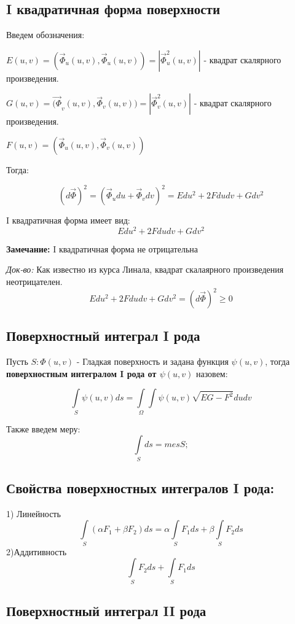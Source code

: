 \documentclass[12pt]{article}
\begin{document}
\subsection*{I квадратичная форма поверхности}
	
	Введем обозначения:
		
	$E(u , v) = (\vec{\Phi}_u(u , v) , \vec{\Phi}_u( u, v)) = |\vec{\Phi}_u^2( u, v)|$ - квадрат скалярного произведения.
	
	$G(u , v) = \vec{(\Phi}_v(u , v) , \vec{\Phi}_v( u, v)) = |\vec{\Phi}_v^2( u, v)|$ - квадрат скалярного произведения.
	
	$F(u , v) = (\vec{\Phi}_u(u , v) , \vec{\Phi}_v( u, v))$
	
	Тогда:
	
	$$(d\vec{\Phi})^2 = (\vec{\Phi}_u du + \vec{\Phi}_v dv)^2 = Edu^2 + 2Fdudv + Gdv^2$$
	
	I квадратичная форма имеет вид:
	$$Edu^2 + 2Fdudv + Gdv^2$$			
	
\textbf{Замечание:}
	I квадратичная форма не отрицательна
	
\textit{Док-во:}
Как известно из курса Линала, квадрат скалаярного произведения неотрицателен.
	$$Edu^2 + 2Fdudv + Gdv^2 = (d\vec{\Phi})^2 \geqslant 0$$
	
\subsection*{Поверхностный интеграл I рода}
	Пусть $S : \Phi(u , v)$ - Гладкая поверхность и задана функция $\psi(u , v)$, тогда \textbf{поверхностным интегралом I рода от $\psi(u,v)$} назовем:
	
$$
\int\limits_{S} \psi(u , v) ds 
=
\int\limits_{\Omega}\int \psi(u,v)\sqrt{EG - F^2}dudv	
$$		
	
	Также введем меру:
$$
	\int\limits_{S}ds = mesS;
$$	
	
\subsection*{Свойства поверхностных интегралов I рода:}
	1) Линейность
$$
\int\limits_{S} (\alpha F_1 + \beta F_2)ds
=
\alpha\int\limits_{S}  F_1ds
+
\beta\int\limits_{S}  F_2ds
$$
	2)Аддитивность	
$$
\int\limits_{S}  F_2ds
+
\int\limits_{S}  F_1ds
$$



\subsection*{Поверхностный интеграл II рода}
\end{document}
